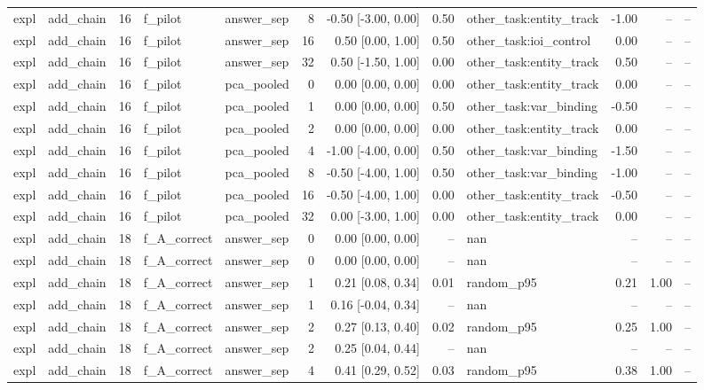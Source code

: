 \begin{tabular}{llrllrrrlrrr}
expl & add\_chain & 16 & f\_pilot & answer\_sep & 8 & -0.50 [-3.00, 0.00] & 0.50 & other\_task:entity\_track & -1.00 & -- & -- \\
expl & add\_chain & 16 & f\_pilot & answer\_sep & 16 & 0.50 [0.00, 1.00] & 0.50 & other\_task:ioi\_control & 0.00 & -- & -- \\
expl & add\_chain & 16 & f\_pilot & answer\_sep & 32 & 0.50 [-1.50, 1.00] & 0.00 & other\_task:entity\_track & 0.50 & -- & -- \\
expl & add\_chain & 16 & f\_pilot & pca\_pooled & 0 & 0.00 [0.00, 0.00] & 0.00 & other\_task:entity\_track & 0.00 & -- & -- \\
expl & add\_chain & 16 & f\_pilot & pca\_pooled & 1 & 0.00 [0.00, 0.00] & 0.50 & other\_task:var\_binding & -0.50 & -- & -- \\
expl & add\_chain & 16 & f\_pilot & pca\_pooled & 2 & 0.00 [0.00, 0.00] & 0.00 & other\_task:entity\_track & 0.00 & -- & -- \\
expl & add\_chain & 16 & f\_pilot & pca\_pooled & 4 & -1.00 [-4.00, 0.00] & 0.50 & other\_task:var\_binding & -1.50 & -- & -- \\
expl & add\_chain & 16 & f\_pilot & pca\_pooled & 8 & -0.50 [-4.00, 1.00] & 0.50 & other\_task:var\_binding & -1.00 & -- & -- \\
expl & add\_chain & 16 & f\_pilot & pca\_pooled & 16 & -0.50 [-4.00, 1.00] & 0.00 & other\_task:entity\_track & -0.50 & -- & -- \\
expl & add\_chain & 16 & f\_pilot & pca\_pooled & 32 & 0.00 [-3.00, 1.00] & 0.00 & other\_task:entity\_track & 0.00 & -- & -- \\
expl & add\_chain & 18 & f\_A\_correct & answer\_sep & 0 & 0.00 [0.00, 0.00] & -- & nan & -- & -- & -- \\
expl & add\_chain & 18 & f\_A\_correct & answer\_sep & 0 & 0.00 [0.00, 0.00] & -- & nan & -- & -- & -- \\
expl & add\_chain & 18 & f\_A\_correct & answer\_sep & 1 & 0.21 [0.08, 0.34] & 0.01 & random\_p95 & 0.21 & 1.00 & -- \\
expl & add\_chain & 18 & f\_A\_correct & answer\_sep & 1 & 0.16 [-0.04, 0.34] & -- & nan & -- & -- & -- \\
expl & add\_chain & 18 & f\_A\_correct & answer\_sep & 2 & 0.27 [0.13, 0.40] & 0.02 & random\_p95 & 0.25 & 1.00 & -- \\
expl & add\_chain & 18 & f\_A\_correct & answer\_sep & 2 & 0.25 [0.04, 0.44] & -- & nan & -- & -- & -- \\
expl & add\_chain & 18 & f\_A\_correct & answer\_sep & 4 & 0.41 [0.29, 0.52] & 0.03 & random\_p95 & 0.38 & 1.00 & -- \\

\end{tabular}

